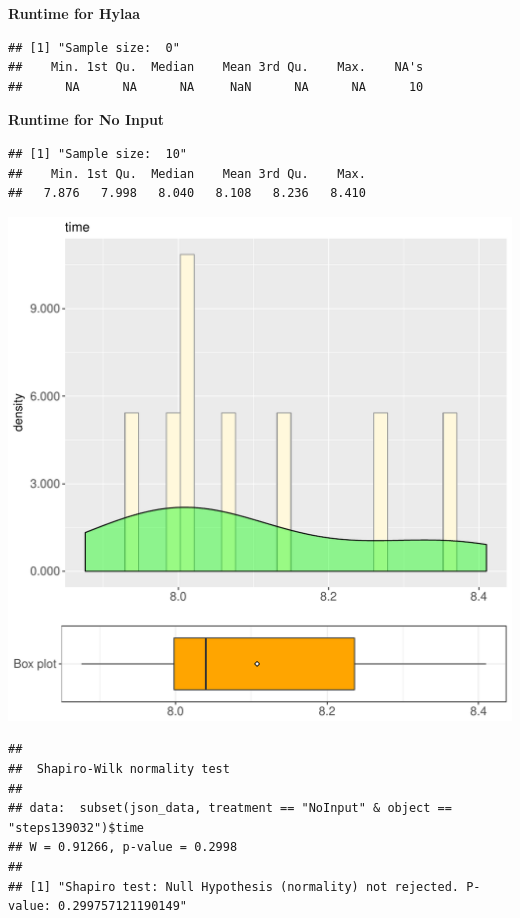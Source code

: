 \documentclass{article}\usepackage[]{graphicx}\usepackage[]{color}
\makeatletter
\def\maxwidth{ %
  \ifdim\Gin@nat@width>\linewidth
    \linewidth
  \else
    \Gin@nat@width
  \fi
}
\newenvironment{kframe}{%
 \def\at@end@of@kframe{}%
 \ifinner\ifhmode%
  \def\at@end@of@kframe{\end{minipage}}%
  \begin{minipage}{\columnwidth}%
 \fi\fi%
 \def\FrameCommand##1{\hskip\@totalleftmargin \hskip-\fboxsep
 \colorbox{shadecolor}{##1}\hskip-\fboxsep
     \hskip-\linewidth \hskip-\@totalleftmargin \hskip\columnwidth}%
 \MakeFramed {\advance\hsize-\width
   \@totalleftmargin\z@ \linewidth\hsize
   \@setminipage}}%
 {\par\unskip\endMakeFramed%
 \at@end@of@kframe}
\newenvironment{knitrout}{}{} %
\makeatother
\begin{document}
 \textbf{Runtime for Hylaa}
\begin{knitrout}
\color{fgcolor}\begin{kframe}
\begin{verbatim}
## [1] "Sample size:  0"
##    Min. 1st Qu.  Median    Mean 3rd Qu.    Max.    NA's 
##      NA      NA      NA     NaN      NA      NA      10
\end{verbatim}
\end{kframe}
\end{knitrout}
 \textbf{Runtime for No Input}
\begin{knitrout}
\color{fgcolor}\begin{kframe}
\begin{verbatim}
## [1] "Sample size:  10"
##    Min. 1st Qu.  Median    Mean 3rd Qu.    Max. 
##   7.876   7.998   8.040   8.108   8.236   8.410
\end{verbatim}
\end{kframe}
\includegraphics[width=\maxwidth]{figure/RH4_NoInput_steps139032-1} 
\begin{kframe}\begin{verbatim}
## 
## 	Shapiro-Wilk normality test
## 
## data:  subset(json_data, treatment == "NoInput" & object == "steps139032")$time
## W = 0.91266, p-value = 0.2998
## 
## [1] "Shapiro test: Null Hypothesis (normality) not rejected. P-value: 0.299757121190149"
\end{verbatim}
\end{kframe}
\end{knitrout}
  
\end{document}
